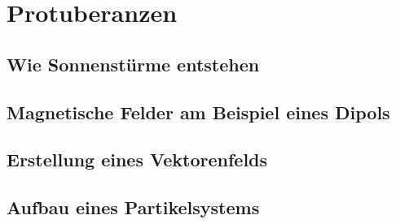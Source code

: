 \section{Protuberanzen}
\subsection{Wie Sonnenstürme entstehen}
\subsection{Magnetische Felder am Beispiel eines Dipols}
\subsection{Erstellung eines Vektorenfelds}
\subsection{Aufbau eines Partikelsystems}
